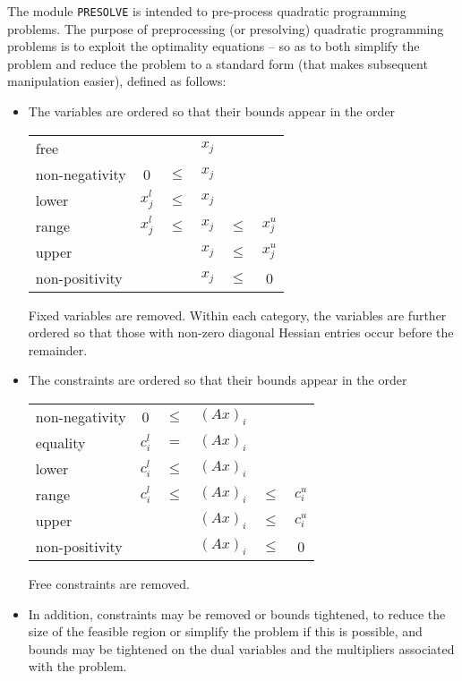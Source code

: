 \documentclass[twoside]{article}
\begin{document}
The module {\tt PRESOLVE} is intended to pre-process
quadratic programming problems. 
The purpose of preprocessing (or presolving) 
quadratic programming problems is to exploit the 
optimality equations -- so as to both simplify the problem
and reduce the problem to a standard form (that makes subsequent 
manipulation easier), defined as follows: 
\begin{itemize}
\item The variables are ordered so that their bounds appear in the order
\begin{center}
\begin{tabular}{lccccc}
free                &          &        & $x_j$ &        &          \\
non-negativity      &   0      & $\leq$ & $x_j$ &        &          \\
lower               & $x^l_j$ & $\leq$ & $x_j$ &        &          \\
range               & $x^l_j$ & $\leq$ & $x_j$ & $\leq$ & $x^u_j$ \\
upper               &          &        & $x_j$ & $\leq$ & $x^u_j$ \\
non-positivity      &          &        & $x_j$ & $\leq$ &      0   \\
\end{tabular}
\end{center}

Fixed variables are removed. Within each category, the variables 
are further ordered so that those with non-zero diagonal Hessian 
entries occur before the remainder.

\item
The constraints are ordered so that their bounds appear in the order
\begin{center}
\begin{tabular}{lccccc}
non-negativity      &     0    & $\leq$ & $( A x)_i$ &        &          \\
equality            & $c^l_i$ &   $=$  & $(A x)_i$ &        &          \\
lower               & $c^l_i$ & $\leq$ & $(A x)_i$ &        &          \\
range               & $c^l_i$ & $\leq$ & $(A x)_i$ & $\leq$ & $c^u_i$ \\
upper               &          &        & $(A x)_i$ & $\leq$ & $c^u_i$ \\
non-positivity      &          &        & $(A x)_i$ & $\leq$ &     0    \\
\end{tabular}
\end{center}
Free constraints are removed. 

\item
In addition, constraints may be removed or bounds tightened, to reduce the
size of the feasible region or simplify the problem if this is possible, and
bounds may be tightened on the dual variables and the multipliers 
associated  with the problem. 
\end{itemize}
\end{document}
